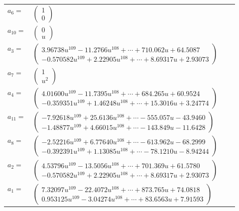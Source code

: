 \documentclass[1p]{elsarticle_modified}
\theoremstyle{definition}
\begin{document}
\begin{tabular}{m{7pt} m{180pt} m{7pt} m{180pt} }
\flushright $a_{6}=$&$\begin{pmatrix}1\\0\end{pmatrix}$ \\
\flushright $a_{10}=$&$\begin{pmatrix}0\\u\end{pmatrix}$ \\
\flushright $a_{3}=$&$\begin{pmatrix}3.96738 u^{109}-11.2766 u^{108}+\cdots+710.062 u+64.5087\\-0.570582 u^{109}+2.22905 u^{108}+\cdots+8.69317 u+2.93073\end{pmatrix}$ \\
\flushright $a_{7}=$&$\begin{pmatrix}1\\u^2\end{pmatrix}$ \\
\flushright $a_{4}=$&$\begin{pmatrix}4.01600 u^{109}-11.7395 u^{108}+\cdots+684.265 u+60.9524\\-0.359351 u^{109}+1.46248 u^{108}+\cdots+15.3016 u+3.24774\end{pmatrix}$ \\
\flushright $a_{11}=$&$\begin{pmatrix}-7.92618 u^{109}+25.6136 u^{108}+\cdots-555.057 u-43.9460\\-1.48877 u^{109}+4.66015 u^{108}+\cdots-143.849 u-11.6428\end{pmatrix}$ \\
\flushright $a_{8}=$&$\begin{pmatrix}-2.52216 u^{109}+6.77640 u^{108}+\cdots-613.962 u-68.2999\\-0.392391 u^{109}+1.13085 u^{108}+\cdots-78.1210 u-8.94244\end{pmatrix}$ \\
\flushright $a_{2}=$&$\begin{pmatrix}4.53796 u^{109}-13.5056 u^{108}+\cdots+701.369 u+61.5780\\-0.570582 u^{109}+2.22905 u^{108}+\cdots+8.69317 u+2.93073\end{pmatrix}$ \\
\flushright $a_{1}=$&$\begin{pmatrix}7.32097 u^{109}-22.4072 u^{108}+\cdots+873.765 u+74.0818\\0.953125 u^{109}-3.04274 u^{108}+\cdots+83.6563 u+7.91593\end{pmatrix}$ \\

\end{tabular}
\end{document}
